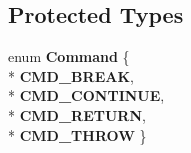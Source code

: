 \subsection*{Protected Types}
\begin{DoxyCompactItemize}
\item 
enum {\bfseries Command} \{ \\*
{\bfseries C\+M\+D\+\_\+\+B\+R\+E\+AK}, 
\\*
{\bfseries C\+M\+D\+\_\+\+C\+O\+N\+T\+I\+N\+UE}, 
\\*
{\bfseries C\+M\+D\+\_\+\+R\+E\+T\+U\+RN}, 
\\*
{\bfseries C\+M\+D\+\_\+\+T\+H\+R\+OW}
 \}\hypertarget{classv8_1_1internal_1_1compiler_1_1_b_a_s_e___e_m_b_e_d_d_e_d_a95297d7d004d31ebcaea92ab67ad40e0}{}\label{classv8_1_1internal_1_1compiler_1_1_b_a_s_e___e_m_b_e_d_d_e_d_a95297d7d004d31ebcaea92ab67ad40e0}

\end{DoxyCompactItemize}
